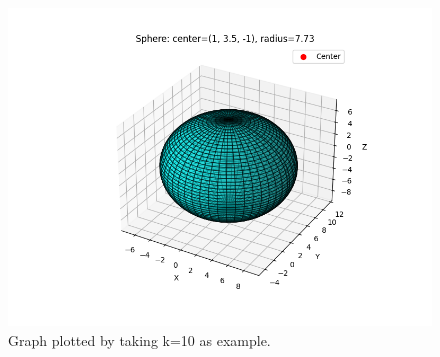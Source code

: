 \documentclass[journal]{IEEEtran}
\begin{document}
\begin{figure}[ht!]
\centering
\includegraphics[height=0.5\textheight, keepaspectratio]{figs/fig1.png}
\caption{Graph plotted by taking k=10 as example.}
\end{figure}
\end{document}
